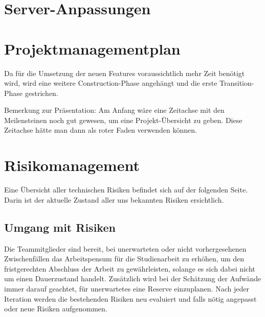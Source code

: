\documentclass[12pt, a4paper]{report}
\begin{document}
	
	
	
	\chapter{Server-Anpassungen}
	
	\chapter{Projektmanagementplan}
	
	Da für die Umsetzung der neuen Features voraussichtlich mehr Zeit benötigt wird, wird eine weitere Construction-Phase angehängt und die erste Transition-Phase gestrichen.
	
	Bemerkung zur Präsentation:
	Am Anfang wäre eine Zeitachse mit den Meilensteinen noch gut gewesen, um eine Projekt-Übersicht zu geben. Diese Zeitachse hätte man dann als roter Faden verwenden können.
	
	
	
	\chapter{Risikomanagement}
	Eine Übersicht aller technischen Risiken befindet sich auf der folgenden Seite. Darin ist der aktuelle Zustand aller uns bekannten Risiken ersichtlich.
	
	\section{Umgang mit Risiken}
	Die Teammitglieder sind bereit, bei unerwarteten oder nicht vorhergesehenen Zwischenfällen das Arbeitspensum für die Studienarbeit zu erhöhen, um den fristgerechten Abschluss der Arbeit zu gewährleisten, solange es sich dabei nicht um einen Dauerzustand handelt. Zusätzlich wird bei der Schätzung der Aufwände immer darauf geachtet, für unerwartetes eine Reserve einzuplanen.
	Nach jeder Iteration werden die bestehenden Risiken neu evaluiert und falls nötig angepasst oder neue Risiken aufgenommen.
	
\end{document}
